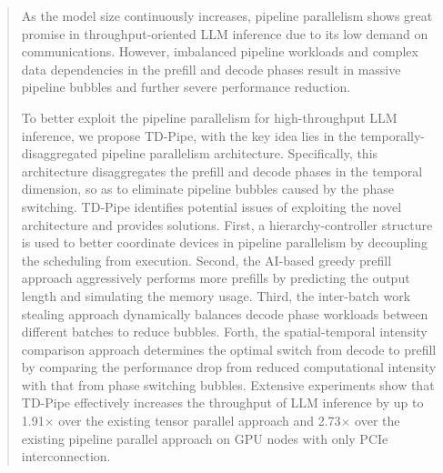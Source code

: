 \documentclass[sigconf,noacm]{acmart}
\begin{document}
\renewcommand{\shortauthors}{Hongbin Zhang et al.}
\begin{abstract}
As the model size continuously increases, 
pipeline parallelism shows great promise in throughput-oriented LLM inference due to its low demand on communications.
However, imbalanced pipeline workloads and complex data dependencies in the prefill and decode phases result in massive pipeline bubbles and further severe performance reduction.

To better exploit the pipeline parallelism for high-throughput LLM inference, we propose TD-Pipe, with the key idea lies in the temporally-disaggregated pipeline parallelism architecture.
Specifically, this architecture disaggregates the prefill and decode phases in the temporal dimension, so as to eliminate pipeline bubbles caused by the phase switching.
TD-Pipe identifies potential issues of exploiting the novel architecture and provides solutions.
First, a hierarchy-controller structure is used to better coordinate devices in pipeline parallelism by decoupling the scheduling from execution.
Second, the AI-based greedy prefill approach aggressively performs more prefills by predicting the output length and simulating the memory usage.
Third, the inter-batch work stealing approach dynamically balances decode phase workloads between different batches to reduce bubbles.
Forth, the spatial-temporal intensity comparison approach determines the optimal switch from decode to prefill by comparing the performance drop from reduced computational intensity with that from phase switching bubbles.
Extensive experiments show that TD-Pipe effectively increases the throughput of LLM inference by up to 1.91$\times$ over the existing tensor parallel approach and 2.73$\times$ over the existing pipeline parallel approach on GPU nodes with only PCIe interconnection.
\end{abstract}
\end{document}
